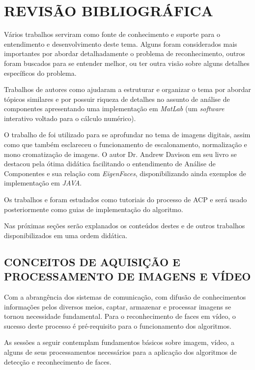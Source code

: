 
\chapter{REVISÃO BIBLIOGRÁFICA}\label{ch:rev-bibs}

Vários trabalhos serviram como fonte de conhecimento e suporte para o entendimento e desenvolvimento deste tema. Alguns foram considerados mais importantes por abordar detalhadamente o problema de reconhecimento, outros foram buscados para se entender melhor, ou ter outra visão sobre alguns detalhes específicos do problema.

Trabalhos de autores como \cite{geysilva} ajudaram a estruturar e organizar o tema por abordar tópicos similares e por possuir riqueza de detalhes no assunto de análise de componentes apresentando uma implementação em \textit{MatLab} (um \textit{software} interativo voltado para o cálculo numérico).

O trabalho de \cite{img-digital-willians} foi utilizado para se aprofundar no tema de imagens digitais, assim como  \cite{gonzalez_woods} que também esclareceu o funcionamento de escalonamento, normalização e mono cromatização de imagens. O autor Dr. Andrew Davison em seu livro \cite{drmathew_java_programming} se destacou pela ótima didática facilitando o entendimento de Análise de Componentes e sua relação com \textit{EigenFaces}, disponibilizando ainda exemplos de implementação em \textit{JAVA}. 

Os trabalhos \cite{tutorial_en_smith} e \cite{tutorial_pt} foram estudados como tutoriais do processo de ACP e será usado posteriormente como guias de implementação do algoritmo.

Nas próximas seções serão explanados os conteúdos destes e de outros trabalhos disponibilizados em uma ordem didática.


\section{CONCEITOS DE AQUISIÇÃO E PROCESSAMENTO DE IMAGENS E VÍDEO}\label{sec:processamento_imagens}

Com a abrangência dos sistemas de comunicação, com difusão de conhecimentos informações pelos diversos meios, captar, armazenar e processar imagens se tornou necessidade fundamental. Para o reconhecimento de faces em vídeo, o sucesso deste processo é pré-requisito  para o funcionamento dos algoritmos. 

As sessões a seguir contemplam fundamentos básicos sobre imagem, vídeo, a alguns de seus processamentos necessários para a aplicação dos algoritmos de detecção e reconhecimento de faces.


